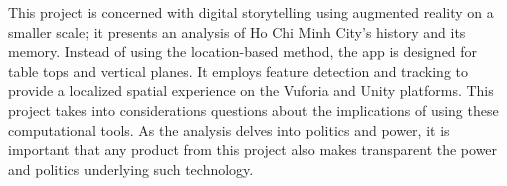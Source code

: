 \begin{figure}[!ht]
\end{figure}

This project is concerned with digital storytelling using augmented reality on a smaller scale; it presents an analysis of Ho Chi Minh City's history and its memory. Instead of using the location-based method, the app is designed for table tops and vertical planes. It employs feature detection and tracking to provide a localized spatial experience on the Vuforia and Unity platforms. This project takes into considerations questions about the implications of using these computational tools. As the analysis delves into politics and power, it is important that any product from this project also makes transparent the power and politics underlying such technology.
